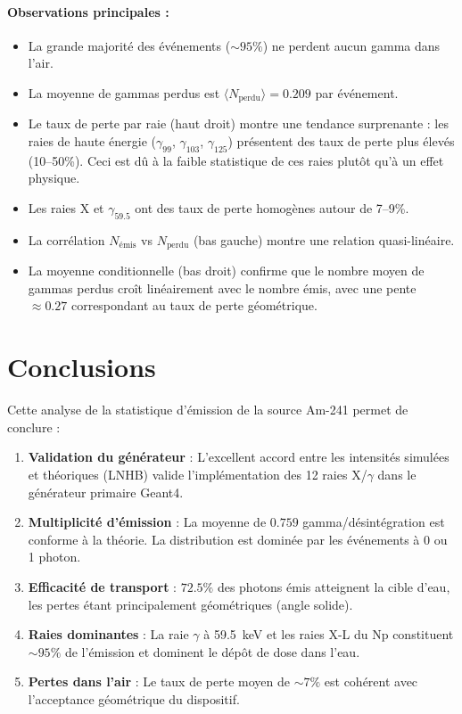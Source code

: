 \documentclass[11pt,a4paper]{article}
\begin{document}
\paragraph{Observations principales :}
\begin{itemize}
    \item La grande majorité des événements ($\sim 95\%$) ne perdent aucun gamma dans l'air.
    \item La moyenne de gammas perdus est $\langle N_{\text{perdu}} \rangle = 0.209$ par événement.
    \item Le taux de perte par raie (haut droit) montre une tendance surprenante : les raies de haute énergie ($\gamma_{99}$, $\gamma_{103}$, $\gamma_{125}$) présentent des taux de perte plus élevés (10--50\%). Ceci est dû à la faible statistique de ces raies plutôt qu'à un effet physique.
    \item Les raies X et $\gamma_{59.5}$ ont des taux de perte homogènes autour de 7--9\%.
    \item La corrélation $N_{\text{émis}}$ vs $N_{\text{perdu}}$ (bas gauche) montre une relation quasi-linéaire.
    \item La moyenne conditionnelle (bas droit) confirme que le nombre moyen de gammas perdus croît linéairement avec le nombre émis, avec une pente $\approx 0.27$ correspondant au taux de perte géométrique.
\end{itemize}

\section{Conclusions}

Cette analyse de la statistique d'émission de la source Am-241 permet de conclure :

\begin{enumerate}
    \item \textbf{Validation du générateur} : L'excellent accord entre les intensités simulées et théoriques (LNHB) valide l'implémentation des 12 raies X/$\gamma$ dans le générateur primaire Geant4.
    
    \item \textbf{Multiplicité d'émission} : La moyenne de $0.759$ gamma/désintégration est conforme à la théorie. La distribution est dominée par les événements à 0 ou 1 photon.
    
    \item \textbf{Efficacité de transport} : $72.5\%$ des photons émis atteignent la cible d'eau, les pertes étant principalement géométriques (angle solide).
    
    \item \textbf{Raies dominantes} : La raie $\gamma$ à \SI{59.5}{keV} et les raies X-L du Np constituent $\sim 95\%$ de l'émission et dominent le dépôt de dose dans l'eau.
    
    \item \textbf{Pertes dans l'air} : Le taux de perte moyen de $\sim 7\%$ est cohérent avec l'acceptance géométrique du dispositif.
\end{enumerate}
\end{document}
